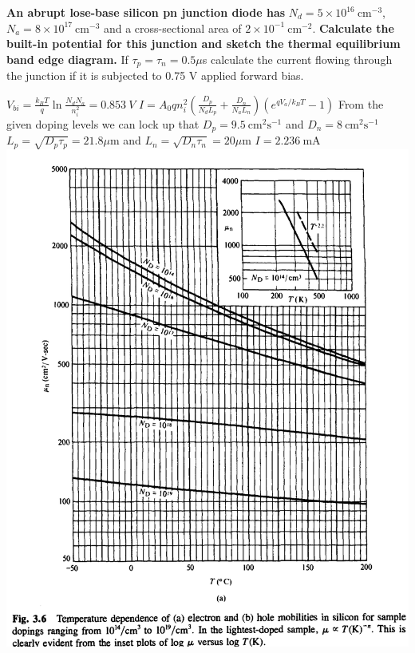 \begin{multicols}{3}
\textbf{An abrupt lose-base silicon pn junction diode has} $N_d=5 \times 10^{16} \ \text{cm}^{-3}$, $N_a=8 \times 10^{17} \ \text{cm}^{-3}$ and a cross-sectional area of $2\times 10^{-1} \ \text{cm}^{-2}$. \textbf{Calculate the built-in potential for this junction and sketch the thermal equilibrium band edge diagram.} If $\tau_p=\tau_n=0.5 \mu$s calculate the current flowing through the junction if it is subjected to 0.75 V applied forward bias.

$V_{bi}=\frac{k_BT}{q} \ln \frac{N_dN_a}{n_i^2}=0.853 \ V$ $I=A_0 q n_i^2 \left(\frac{D_p}{N_dL_p}+\frac{D_n}{N_aL_n}\right) \left(e^{qV_a/k_BT}-1 \right)$
From the given doping levels we can lock up that $D_p=9.5 \ \text{cm}^2\text{s}^{-1}$ and $D_n=8 \ \text{cm}^2 \text{s}^{-1}$
$L_p=\sqrt{D_p \tau_p}=21.8 \mu$m and $L_n=\sqrt{D_n \tau_n}=20 \mu$m $I=2.236 \ \text{mA}$
  \medbreak\noindent\minipage{\columnwidth}
            \includegraphics[width=\columnwidth]{V1Figure3-6.png}
        \endminipage\medbreak


\end{multicols}
